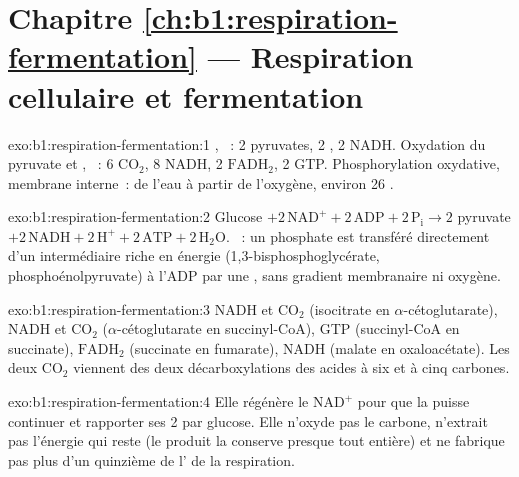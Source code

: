 \section*{Chapitre \ref{ch:b1:respiration-fermentation} --- Respiration cellulaire et fermentation}

\begin{solution}{exo:b1:respiration-fermentation:1}
, ~: 2 pyruvates, 2 , 2 NADH. Oxydation du pyruvate
et , ~: 6 $\mathrm{CO_2}$, 8 NADH, 2
$\mathrm{FADH_2}$, 2 GTP. Phosphorylation oxydative, membrane interne~:
de l'eau à partir de l'oxygène, environ 26 .
\end{solution}

\begin{solution}{exo:b1:respiration-fermentation:2}
Glucose $+ 2\,\mathrm{NAD^+} + 2\,\mathrm{ADP} + 2\,\mathrm{P_i} \to
2$ pyruvate $+ 2\,\mathrm{NADH} + 2\,\mathrm{H^+} + 2\,\mathrm{ATP} +
2\,\mathrm{H_2O}$. ~: un phosphate
est transféré directement d'un intermédiaire riche en énergie
(1,3-bisphosphoglycérate, phosphoénolpyruvate) à l'ADP par une ,
sans gradient membranaire ni oxygène.
\end{solution}

\begin{solution}{exo:b1:respiration-fermentation:3}
NADH et $\mathrm{CO_2}$ (isocitrate en $\alpha$-cétoglutarate), NADH
et $\mathrm{CO_2}$ ($\alpha$-cétoglutarate en succinyl-CoA), GTP
(succinyl-CoA en succinate), $\mathrm{FADH_2}$ (succinate en fumarate),
NADH (malate en oxaloacétate). Les deux $\mathrm{CO_2}$ viennent des
deux décarboxylations des acides à six et à cinq carbones.
\end{solution}

\begin{solution}{exo:b1:respiration-fermentation:4}
Elle régénère le $\mathrm{NAD^+}$ pour que la  puisse continuer
et rapporter ses 2  par glucose. Elle n'oxyde pas le carbone,
n'extrait pas l'énergie qui reste (le produit la conserve presque tout
entière) et ne fabrique pas plus d'un quinzième de l' de la
respiration.
\end{solution}

